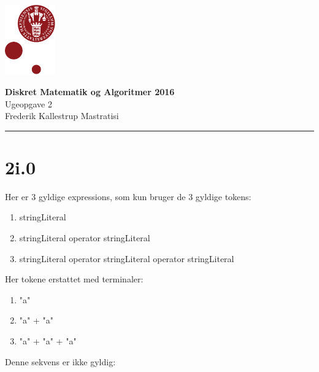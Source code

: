 \documentclass[12pt, a4paper, hidelinks]{article}
\begin{document}
\begin{minipage}[b]{1.0\linewidth}
\includegraphics[height=30mm]{KULogo}

\vspace*{-16ex}
\begin{center}
    {\Large \bf Diskret Matematik og Algoritmer 2016} \vspace*{1ex} \\
    {\large Ugeopgave 2} \vspace*{1ex} \\
    {\large Frederik Kallestrup Mastratisi}
\end{center}
\vspace*{-3pt}
{\color{KU-red}\hrule}
\end{minipage}
\vspace{2ex}

\tableofcontents \newpage

\setcounter{section}{0}
\setcounter{subsection}{-1}



\section{2i.0}

Her er 3 gyldige expressions, som kun bruger de 3 gyldige tokens:
\begin{enumerate}
\item  stringLiteral
\item stringLiteral operator stringLiteral
\item stringLiteral operator stringLiteral operator stringLiteral
\end{enumerate}

Her tokene erstattet med terminaler:
\begin{enumerate}
\item "a"
\item "a" + "a"
\item "a" + "a" + "a"
\end{enumerate}

Denne sekvens er ikke gyldig:
\end{document}
